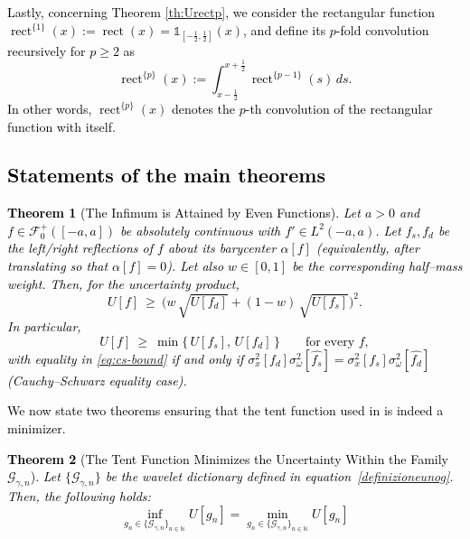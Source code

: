 \documentclass[preprint,hidelinks,authoryear]{elsarticle}
\newtheorem{Thm}{Theorem}[section]
\theoremstyle{plain}
\theoremstyle{definition}
\theoremstyle{remark}
\begin{document}
\textcolor{black}{Lastly, concerning Theorem \ref{th:Urectp}, we consider the rectangular function $ \operatorname{rect}^{\{1\}}(x) := \operatorname{rect}(x) = \mathds{1}_{[-\frac{1}{2}, \frac{1}{2}]}(x) $, and define its $ p $-fold convolution recursively for $ p \ge 2 $ as \cite{schoenberg1946contributions,schoenberg1969cardinal,de2018stability}
$$
\operatorname{rect}^{\{p\}}(x) := \int_{x - \frac{1}{2}}^{x + \frac{1}{2}} \operatorname{rect}^{\{p-1\}}(s) \, ds.
$$
In other words, $ \operatorname{rect}^{\{p\}}(x) $ denotes the $ p $-th convolution of the rectangular function with itself.
}



\textcolor{black}{\subsection{Statements of the main theorems}
\label{sec:mainres}
\begin{Thm}[The Infimum is Attained by Even Functions]
\label{th:infimumevenf}
Let $a>0$ and $f\in\mathcal F_0^+([-a,a])$ be absolutely continuous with $f'\in L^2(-a,a)$. Let $f_s,f_d$ be the left/right reflections of $f$ \emph{about its barycenter $\alpha[f]$} (equivalently, after translating so that $\alpha[f]=0$). Let also $w\in[0,1]$ be the corresponding half–mass weight. Then, for the uncertainty product,
\begin{equation}\label{eq:cs-bound}
U[f]\ \ge\ \Big(w\,\sqrt{U[f_d]}+(1-w)\,\sqrt{U[f_s]}\Big)^2.
\end{equation}
In particular,
\begin{equation}\label{eq:min-bound}
U[f]\ \ge\ \min\{\,U[f_s],\,U[f_d]\,\}\qquad\text{for every }f,
\end{equation}
with equality in \eqref{eq:cs-bound} if and only if $\sigma_x^2[f_d] \sigma_\omega^2[\widehat{f_s}]= \sigma_x^2[f_s] \sigma_\omega^2[\widehat{f_d}]$ (Cauchy–Schwarz equality case).
\end{Thm}
We now state two theorems ensuring that the tent function used in \cite{mazzoccoli2024refining} is indeed a minimizer.
\begin{Thm}[The Tent Function Minimizes the Uncertainty Within the Family $\mathcal{G}_{\gamma,n}$]
\label{th:tent1}
Let $ \{\mathcal{G}_{\gamma,n}\} $ be the wavelet dictionary defined in equation~\eqref{definizioneunog}. Then, the following holds:
\begin{equation}
\inf_{g_n \in \{\mathcal{G}_{\gamma,n}\}_{n \in \mathbb{N}}} U[g_n] 
= \min_{g_n \in \{\mathcal{G}_{\gamma,n}\}_{n \in \mathbb{N}}} U[g_n] 

\end{equation}
\end{Thm}}
\end{document}
